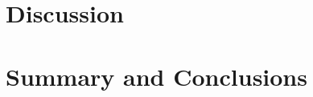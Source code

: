 \documentclass[twocolumn]{aastex631}
\begin{document}
\section{Discussion}


\section{Summary and Conclusions}

\end{document}
